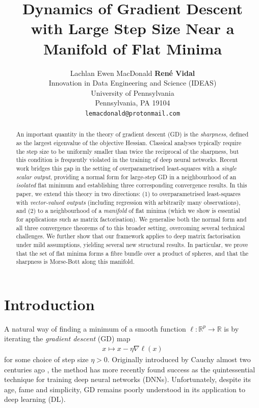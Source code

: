 \documentclass{article}
\title{
Dynamics of Gradient Descent with Large Step Size Near a Manifold of Flat Minima\\
}
\author{%
  Lachlan Ewen MacDonald \quad \textbf{Ren\'{e} Vidal} \\
  Innovation in Data Engineering and Science (IDEAS)\\
  University of Pennsylvania\\
  Pennsylvania, PA 19104 \\
  \texttt{lemacdonald@protonmail.com} \\
}
\newcommand{\RB}{\mathbb{R}}
\theoremstyle{plain}
\theoremstyle{definition}
\theoremstyle{remark}
\begin{document}
\maketitle


\begin{abstract}  
    An important quantity in the theory of gradient descent (GD) is the \emph{sharpness}, defined as the largest eigenvalue of the objective Hessian. Classical analyses typically require the step size to be uniformly smaller than twice the reciprocal of the sharpness, but this condition is frequently violated in the training of deep neural networks. Recent work \cite{macdonaldeos} bridges this gap in the setting of overparametrised least-squares with a \emph{single scalar output}, providing a normal form for large-step GD in a neighbourhood of an \emph{isolated} flat minimum and establishing three corresponding convergence results. In this paper, we extend this theory in two directions: (1) to overparametrised least-squares with \emph{vector-valued outputs} (including regression with arbitrarily many observations), and (2) to a neighbourhood of a \emph{manifold} of flat minima (which we show is essential for applications such as matrix factorisation). We generalise both the normal form and all three convergence theorems of \cite{macdonaldeos} to this broader setting, overcoming several technical challenges. We further show that our framework applies to deep matrix factorisation under mild assumptions, yielding several new structural results. In particular, we prove that the set of flat minima forms a fibre bundle over a product of spheres, and that the sharpness is Morse-Bott along this manifold.
        
\end{abstract}

\section{Introduction}

A natural way of finding a minimum of a smooth function $\ell:\RB^p\rightarrow\RB$ is by iterating the \emph{gradient descent} (GD) map
\begin{align}\label{eq:GD}
x\mapsto x-\eta\nabla\ell(x)
\end{align}
for some choice of step size $\eta>0$. Originally introduced by Cauchy almost two centuries ago \cite{cauchygd}, the method has more recently found success as the quintessential technique for training deep neural networks (DNNs). Unfortunately, despite its age, fame and simplicity, GD remains poorly understood in its application to deep learning (DL).
\end{document}

